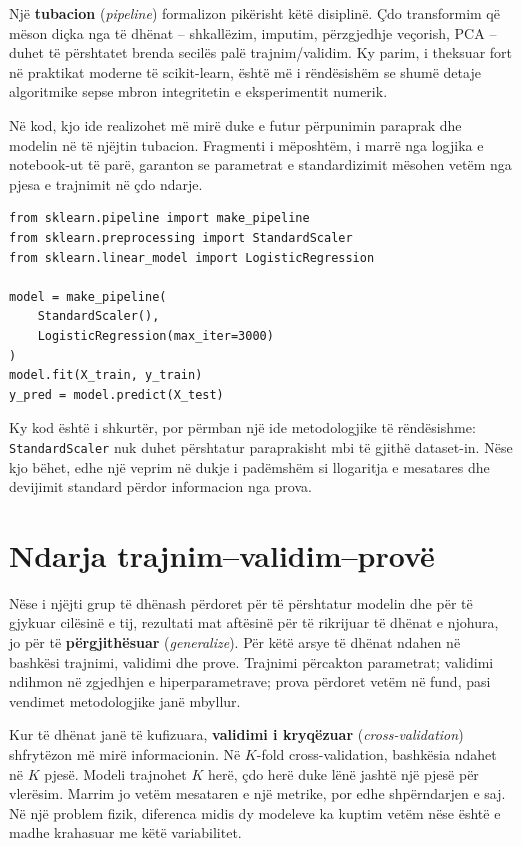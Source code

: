 \documentclass[12pt,a4paper,oneside]{book}
\newcommand{\term}[2]{\textbf{#1} (\textit{#2})}
\begin{document}
Një \term{tubacion}{pipeline} formalizon pikërisht këtë disiplinë. Çdo transformim që mëson diçka nga të dhënat -- shkallëzim, imputim, përzgjedhje veçorish, PCA -- duhet të përshtatet brenda secilës palë trajnim/validim. Ky parim, i theksuar fort në praktikat moderne të scikit-learn, është më i rëndësishëm se shumë detaje algoritmike sepse mbron integritetin e eksperimentit numerik.

Në kod, kjo ide realizohet më mirë duke e futur përpunimin paraprak dhe modelin në të njëjtin tubacion. Fragmenti i mëposhtëm, i marrë nga logjika e notebook-ut të parë, garanton se parametrat e standardizimit mësohen vetëm nga pjesa e trajnimit në çdo ndarje.
\begin{lstlisting}[caption={Standardizimi dhe modeli brenda të njëjtit pipeline.}]
from sklearn.pipeline import make_pipeline
from sklearn.preprocessing import StandardScaler
from sklearn.linear_model import LogisticRegression

model = make_pipeline(
    StandardScaler(),
    LogisticRegression(max_iter=3000)
)
model.fit(X_train, y_train)
y_pred = model.predict(X_test)
\end{lstlisting}
Ky kod është i shkurtër, por përmban një ide metodologjike të rëndësishme: \texttt{StandardScaler} nuk duhet përshtatur paraprakisht mbi të gjithë dataset-in. Nëse kjo bëhet, edhe një veprim në dukje i padëmshëm si llogaritja e mesatares dhe devijimit standard përdor informacion nga prova.

\section{Ndarja trajnim--validim--provë}

Nëse i njëjti grup të dhënash përdoret për të përshtatur modelin dhe për të gjykuar cilësinë e tij, rezultati mat aftësinë për të rikrijuar të dhënat e njohura, jo për të \term{përgjithësuar}{generalize}. Për këtë arsye të dhënat ndahen në bashkësi trajnimi, validimi dhe prove. Trajnimi përcakton parametrat; validimi ndihmon në zgjedhjen e hiperparametrave; prova përdoret vetëm në fund, pasi vendimet metodologjike janë mbyllur.

Kur të dhënat janë të kufizuara, \term{validimi i kryqëzuar}{cross-validation} shfrytëzon më mirë informacionin. Në $K$-fold cross-validation, bashkësia ndahet në $K$ pjesë. Modeli trajnohet $K$ herë, çdo herë duke lënë jashtë një pjesë për vlerësim. Marrim jo vetëm mesataren e një metrike, por edhe shpërndarjen e saj. Në një problem fizik, diferenca midis dy modeleve ka kuptim vetëm nëse është e madhe krahasuar me këtë variabilitet.
\end{document}
